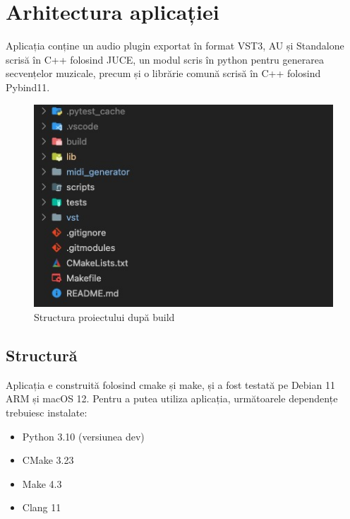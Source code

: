 \section{Arhitectura aplicației} \label{arhitectura}
    \noindent Aplicația conține un audio plugin exportat în format VST3, AU și Standalone scrisă în C++ folosind JUCE, un modul scris în python pentru generarea secvențelor muzicale, precum și o librărie comună scrisă în C++ folosind Pybind11. 
    \begin{figure}[H]
        \centering
        \includegraphics[scale=0.6]{images/structura.jpeg}
        \caption{Structura proiectului după build}
        \label{fig:structure}
    \end{figure}
    
    \subsection{Structură}
        \noindent Aplicația e construită folosind cmake și make, și a fost testată pe Debian 11 ARM și macOS 12. Pentru a putea utiliza aplicația, următoarele dependențe trebuiesc instalate:
        \begin{itemize}
            \item Python 3.10 (versiunea dev)
            \item CMake 3.23
            \item Make 4.3
            \item Clang 11
        \end{itemize}
        
